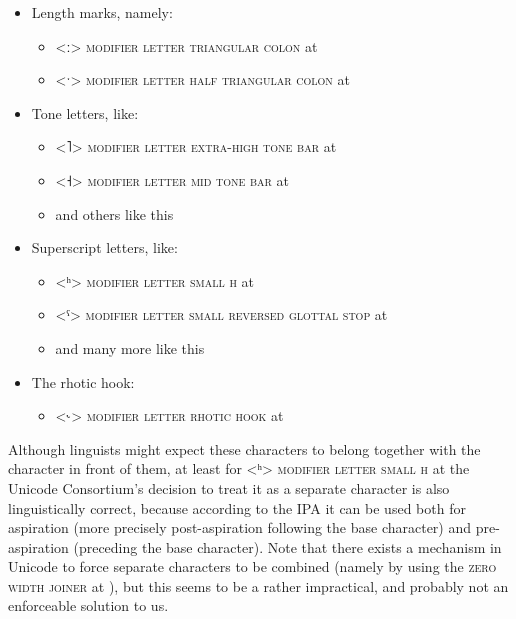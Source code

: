 \begin{itemize}
  
	\item[] Length marks, namely: 
	\begin{itemize}
	  \item[] <ː> \textsc{modifier letter triangular colon} at 
	  \item[] <ˑ> \textsc{modifier letter half triangular colon} at 
	\end{itemize}
	 
	\item[] Tone letters, like: 
	\begin{itemize} 
	  \item[] <˥> \textsc{modifier letter extra-high tone bar} at 
	  \item[] <˧> \textsc{modifier letter mid tone bar} at 
	  \item[] and others like this
	\end{itemize}
	
	\item[] Superscript letters, like:
	\begin{itemize}
	  \item[] <ʰ> \textsc{modifier letter small h} at 
	  \item[] <ˤ> \textsc{modifier letter small reversed glottal stop} at 
	  \item[] and many more like this
	\end{itemize}
	
	\item[] The rhotic hook:
	\begin{itemize}
	  \item[] <˞> \textsc{modifier letter rhotic hook} at 
	\end{itemize}
	
\end{itemize}

Although linguists might expect these characters to belong together with the
character in front of them, at least for <ʰ> \textsc{modifier letter small h} at
 the Unicode Consortium's decision to treat it as a separate character
is also linguistically correct, because according to the IPA it can be used both
for aspiration (more precisely post-aspiration following the base character) and
pre-aspiration (preceding the base character). Note that there exists a mechanism in
Unicode to force separate characters to be combined (namely by using the
\textsc{zero width joiner} at ), but this seems to be a rather
impractical, and probably not an enforceable solution to us.

